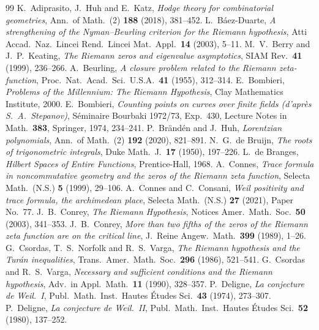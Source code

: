 \documentclass[11pt]{amsart}
\theoremstyle{definition}
\theoremstyle{remark}
\begin{document}
\begin{thebibliography}{99}
 K.~Adiprasito, J.~Huh and E.~Katz, \emph{Hodge theory for combinatorial geometries}, Ann.\ of Math.\ (2) \textbf{188} (2018), 381--452.
 L.~B\'aez-Duarte, \emph{A strengthening of the Nyman--Beurling criterion for the Riemann hypothesis}, Atti Accad.\ Naz.\ Lincei Rend.\ Lincei Mat.\ Appl.\ \textbf{14} (2003), 5--11.
 M.~V.~Berry and J.~P.~Keating, \emph{The Riemann zeros and eigenvalue asymptotics}, SIAM Rev.\ \textbf{41} (1999), 236--266.
 A.~Beurling, \emph{A closure problem related to the Riemann zeta-function}, Proc.\ Nat.\ Acad.\ Sci.\ U.S.A.\ \textbf{41} (1955), 312--314.
 E.~Bombieri, \emph{Problems of the Millennium: The Riemann Hypothesis}, Clay Mathematics Institute, 2000.
 E.~Bombieri, \emph{Counting points on curves over finite fields (d'apr\`es S.~A.~Stepanov)}, S\'eminaire Bourbaki 1972/73, Exp.\ 430, Lecture Notes in Math.\ \textbf{383}, Springer, 1974, 234--241.
 P.~Br\"and\'en and J.~Huh, \emph{Lorentzian polynomials}, Ann.\ of Math.\ (2) \textbf{192} (2020), 821--891.
 N.~G.~de Bruijn, \emph{The roots of trigonometric integrals}, Duke Math.\ J.\ \textbf{17} (1950), 197--226.
 L.~de Branges, \emph{Hilbert Spaces of Entire Functions}, Prentice-Hall, 1968.
 A.~Connes, \emph{Trace formula in noncommutative geometry and the zeros of the Riemann zeta function}, Selecta Math.\ (N.S.) \textbf{5} (1999), 29--106.
 A.~Connes and C.~Consani, \emph{Weil positivity and trace formula, the archimedean place}, Selecta Math.\ (N.S.) \textbf{27} (2021), Paper No.~77.
 J.~B.~Conrey, \emph{The Riemann Hypothesis}, Notices Amer.\ Math.\ Soc.\ \textbf{50} (2003), 341--353.
 J.~B.~Conrey, \emph{More than two fifths of the zeros of the Riemann zeta function are on the critical line}, J.\ Reine Angew.\ Math.\ \textbf{399} (1989), 1--26.
 G.~Csordas, T.~S.~Norfolk and R.~S.~Varga, \emph{The Riemann hypothesis and the Tur\'an inequalities}, Trans.\ Amer.\ Math.\ Soc.\ \textbf{296} (1986), 521--541.
 G.~Csordas and R.~S.~Varga, \emph{Necessary and sufficient conditions and the Riemann hypothesis}, Adv.\ in Appl.\ Math.\ \textbf{11} (1990), 328--357.
 P.~Deligne, \emph{La conjecture de Weil.\ I}, Publ.\ Math.\ Inst.\ Hautes \'Etudes Sci.\ \textbf{43} (1974), 273--307.
 P.~Deligne, \emph{La conjecture de Weil.\ II}, Publ.\ Math.\ Inst.\ Hautes \'Etudes Sci.\ \textbf{52} (1980), 137--252.

\end{thebibliography}
\end{document}
